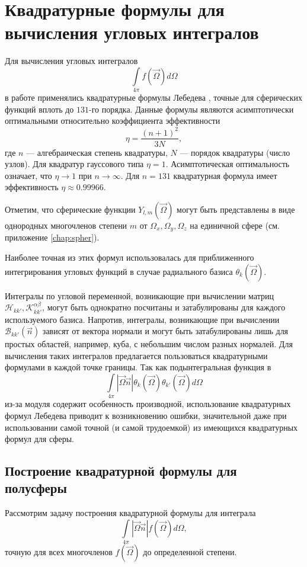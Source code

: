 \section{Квадратурные формулы для вычисления угловых интегралов}

Для вычисления угловых интегралов
\[
\int\limits_{4\pi} f(\vec \Omega) d\Omega 
\]
в работе применялись квадратурные формулы Лебедева \cite{lebedev}, точные для сферических функций вплоть до $131$-го порядка. Данные формулы являются асимптотически оптимальными относительно коэффициента эффективности
\[
\eta = \frac{(n+1)^2}{3N},
\]
где $n$ --- алгебраическая степень квадратуры, $N$ --- порядок квадратуры (число узлов). Для квадратур гауссового типа $\eta = 1$. Асимптотическая оптимальность означает, что $\eta \to 1$ при $n \to \infty$. Для $n = 131$ квадратурная формула имеет эффективность $\eta \approx 0.99966$.

Отметим, что сферические функции $Y_{l,m}(\vec \Omega)$ могут быть представлены в виде однородных многочленов степени $m$ от $\Omega_x, \Omega_y, \Omega_z$ на единичной сфере (см. приложение \ref{chap:spher}).

Наиболее точная из этих формул использовалась для приближенного интегрирования угловых функций в случае радиального базиса $\theta_k(\vec \Omega)$.

Интегралы по угловой переменной, возникающие при вычислении матриц $\mathscr H_{kk'}, \mathscr K_{kk'}^{\alpha\beta}$, могут быть однократно посчитаны и затабулированы для каждого используемого базиса. Напротив, интегралы, возникающие при вычислении $\mathscr{B}_{kk'}(\vec n)$ зависят от вектора нормали и могут быть затабулированы лишь для простых областей, например, куба, с небольшим числом разных нормалей. Для вычисления таких интегралов предлагается пользоваться квадратурными формулами в каждой точке границы. Так как подынтегральная функция в 
\[
\int\limits_{4\pi} |\vec \Omega \vec n| \theta_k(\vec \Omega) \theta_{k'}(\vec \Omega) d\Omega
\]
из-за модуля содержит особенность производной, использование квадратурных формул Лебедева приводит к возникновению ошибки, значительной даже при использовании самой точной (и самой трудоемкой) из имеющихся квадратурных формул для сферы.

\subsection{Построение квадратурной формулы для полусферы}

Рассмотрим задачу построения квадратурной формулы для интеграла
\begin{equation}
\int\limits_{4\pi} |\vec \Omega \vec n| f(\vec \Omega) d\Omega,
\label{eq:abs}
\end{equation}
точную для всех многочленов $f(\vec \Omega)$ до определенной степени.

